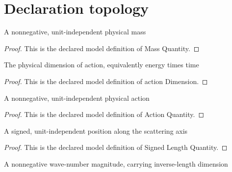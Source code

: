 \section{Declaration topology}
\begin{definition}
  \label{def:physics:phyx-mini-0534:phyxminiproblems-problemphyxmini0534-massquantity}
  A nonnegative, unit-independent physical mass
\end{definition}
\begin{proof}
  This is the declared model definition of Mass Quantity.
\end{proof}
\begin{definition}
  \label{def:physics:phyx-mini-0534:phyxminiproblems-problemphyxmini0534-actiondimension}
  The physical dimension of action, equivalently energy times time
\end{definition}
\begin{proof}
  This is the declared model definition of action Dimension.
\end{proof}
\begin{definition}
  \label{def:physics:phyx-mini-0534:phyxminiproblems-problemphyxmini0534-actionquantity}
  A nonnegative, unit-independent physical action
\end{definition}
\begin{proof}
  This is the declared model definition of Action Quantity.
\end{proof}
\begin{definition}
  \label{def:physics:phyx-mini-0534:phyxminiproblems-problemphyxmini0534-signedlengthquantity}
  A signed, unit-independent position along the scattering axis
\end{definition}
\begin{proof}
  This is the declared model definition of Signed Length Quantity.
\end{proof}
\begin{definition}
  \label{def:physics:phyx-mini-0534:phyxminiproblems-problemphyxmini0534-wavenumberquantity}
  A nonnegative wave-number magnitude, carrying inverse-length dimension
\end{definition}

